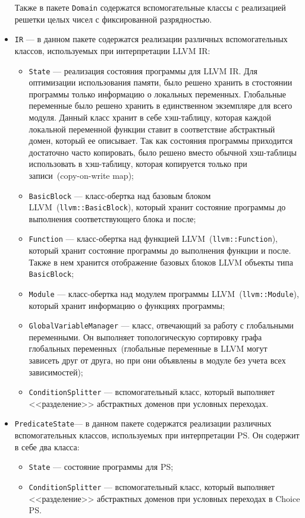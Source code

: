 \begin{itemize}
    Также в пакете \texttt{Domain} содержатся вспомогательные классы с 
    реализацией решетки целых чисел с фиксированной разрядностью.

\item \texttt{IR} --- в данном пакете содержатся реализации различных 
вспомогательных классов, используемых при интерпретации LLVM IR:
    \begin{itemize}
    \item \texttt{State} --- реализация состояния программы для LLVM IR. Для 
    оптимизации использования памяти, было решено хранить в стостоянии 
    программы только информацию о локальных переменных. Глобальные переменные 
    было решено хранить в единственном экземпляре для всего модуля. Данный 
    класс хранит в себе хэш-таблицу, которая каждой локальной переменной 
    функции ставит в соответствие абстрактный домен, который ее описывает. Так 
    как состояния программы приходится достаточно часто копировать, было решено 
    вместо обычной хэш-таблицы использовать в хэш-таблицу, которая копируется 
    только при записи~(copy-on-write map);
    \item \texttt{BasicBlock} --- класс-обертка над базовым блоком 
    LLVM~(\texttt{llvm::BasicBlock}), который хранит состояние программы до
    выполнения соответствующего блока и после;
    \item \texttt{Function} --- класс-обертка над функцией 
    LLVM~(\texttt{llvm::Function}), который хранит состояние программы до 
    выполнения функции и после. Также в нем хранится отображение базовых блоков
    LLVM объекты типа \texttt{BasicBlock};
    \item \texttt{Module} --- класс-обертка над модулем программы
    LLVM~(\texttt{llvm::Module}), который хранит информацию о функциях 
    программы;
    \item \texttt{GlobalVariableManager} --- класс, отвечающий за работу с 
    глобальными переменными. Он выполняет топологическую сортировку графа
    глобальных переменных~(глобальные переменные в LLVM могут зависеть друг от
    друга, но при они объявлены в модуле без учета всех зависимостей);
    \item \texttt{ConditionSplitter} --- вспомогательный класс, который 
    выполняет <<разделение>> абстрактных доменов при условных переходах.
    \end{itemize}
\item \texttt{PredicateState}--- в данном пакете содержатся реализации 
различных вспомогательных классов, используемых при интерпретации PS. Он 
содержит в себе два класса:
    \begin{itemize}
    \item \texttt{State} --- состояние программы для PS;
    \item \texttt{ConditionSplitter} --- вспомогательный класс, который 
    выполняет <<разделение>> абстрактных доменов при условных переходах в 
    Choice PS.
    \end{itemize}
\end{itemize}

